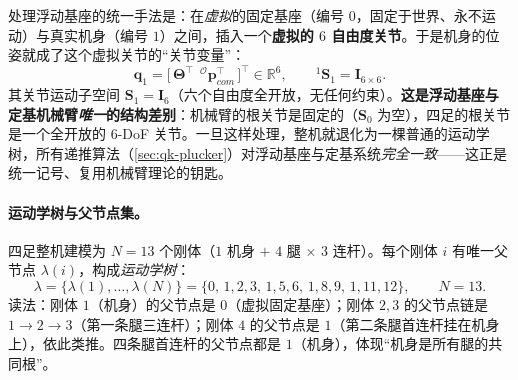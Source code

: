\begin{insight}[K10：浮动基座 $=$ 虚拟 6-DoF 关节（统一记号的关键）]\label{ins:qk-floating-virtual}
处理浮动基座的统一手法是：在\emph{虚拟}的固定基座（编号 $0$，固定于世界、永不运动）与真实机身（编号 $1$）之间，插入一个\textbf{虚拟的 $6$ 自由度关节}\cite{yu2021quadruped}。于是机身的位姿就成了这个虚拟关节的“关节变量”：
\begin{equation}
  \boldsymbol{q}_1=\big[\,\boldsymbol{\Theta}^\top\ \ {}^{\mathcal{O}}\boldsymbol{p}_{com}^\top\,\big]^\top\in\mathbb{R}^6,
  \qquad {}^{1}\mathbf{S}_1=\mathbf{I}_{6\times6}.
  \label{eq:qk-floating-joint}
\end{equation}
其关节运动子空间 $\mathbf{S}_1=\mathbf{I}_6$（六个自由度全开放，无任何约束）。\textbf{这是浮动基座与定基机械臂\emph{唯一}的结构差别}：机械臂的根关节是固定的（$\mathbf{S}_0$ 为空），四足的根关节是一个全开放的 $6$-DoF 关节。一旦这样处理，整机就退化为一棵普通的运动学树，所有递推算法（\cref{sec:qk-plucker}）对浮动基座与定基系统\emph{完全一致}——这正是统一记号、复用机械臂理论的钥匙。
\end{insight}

\paragraph{运动学树与父节点集。}
四足整机建模为 $N=13$ 个刚体（$1$ 机身 $+$ $4$ 腿 $\times$ $3$ 连杆）。每个刚体 $i$ 有唯一父节点 $\lambda(i)$，构成\emph{运动学树}\cite{yu2021quadruped}：
\begin{equation}
  \lambda=\{\lambda(1),\dots,\lambda(N)\}=\{0,\,1,2,3,\,1,5,6,\,1,8,9,\,1,11,12\},\qquad N=13.
  \label{eq:qk-lambda}
\end{equation}
读法：刚体 $1$（机身）的父节点是 $0$（虚拟固定基座）；刚体 $2,3$ 的父节点链是 $1\to2\to3$（第一条腿三连杆）；刚体 $4$ 的父节点是 $1$（第二条腿首连杆挂在机身上），依此类推。四条腿首连杆的父节点都是 $1$（机身），体现“机身是所有腿的共同根”。

